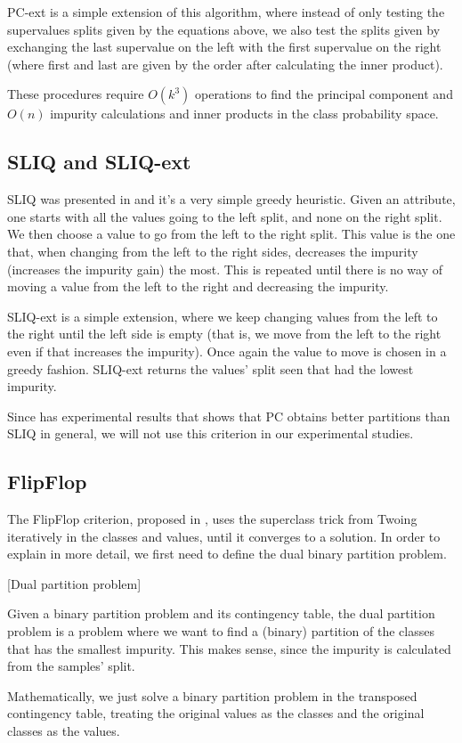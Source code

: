 PC-ext is a simple extension of this algorithm, where instead of only testing the supervalues splits given by the equations above, we also test the splits given by  exchanging the last supervalue on the left with the first supervalue on the right (where first and last are given by the order after calculating the inner product).

These procedures require $O(k^3)$ operations to find the principal component and $O(n)$ impurity calculations and inner products in the class probability space.


\subsection{SLIQ and SLIQ-ext}
SLIQ was presented in \cite{mehta1996sliq} and it's a very simple greedy heuristic. Given an attribute, one starts with all the values going to the left split, and none on the right split. We then choose a value to go from the left to the right split. This value is the one that, when changing from the left to the right sides, decreases the impurity (increases the impurity gain) the most. This is repeated until there is no way of moving a value from the left to the right and decreasing the impurity.

SLIQ-ext is a simple extension, where we keep changing values from the left to the right until the left side is empty (that is, we move from the left to the right even if that increases the impurity). Once again the value to move is chosen in a greedy fashion. SLIQ-ext returns the values' split seen that had the lowest impurity.

Since \cite{journals/datamine/CoppersmithHH99} has experimental results that shows that PC obtains better partitions than SLIQ in general, we will not use this criterion in our experimental studies.


\subsection{FlipFlop}

The FlipFlop criterion, proposed in \cite{nadas1991iterative}, uses the superclass trick from Twoing iteratively in the classes and values, until it converges to a solution. In order to explain in more detail, we first need to define the dual binary partition problem.

\begin{definition}{[Dual partition problem]}

Given a binary partition problem and its contingency table, the dual partition problem is a problem where we want to find a (binary) partition of the classes that has the smallest impurity. This makes sense, since the impurity is calculated from the samples' split. 

Mathematically, we just solve a binary partition problem in the transposed contingency table, treating the original values as the classes and the original classes as the values.
\end{definition} 


